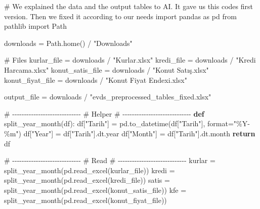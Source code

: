 \documentclass[
  11pt,
  a4paper,
  DIV=11,
  numbers=noendperiod]{scrartcl}
\newenvironment{Shaded}{\begin{snugshade}}{\end{snugshade}}
\newcommand{\BuiltInTok}[1]{\textcolor[rgb]{0.00,0.23,0.31}{#1}}
\newcommand{\CommentTok}[1]{\textcolor[rgb]{0.37,0.37,0.37}{#1}}
\newcommand{\ControlFlowTok}[1]{\textcolor[rgb]{0.00,0.23,0.31}{\textbf{#1}}}
\newcommand{\ImportTok}[1]{\textcolor[rgb]{0.00,0.46,0.62}{#1}}
\newcommand{\KeywordTok}[1]{\textcolor[rgb]{0.00,0.23,0.31}{\textbf{#1}}}
\newcommand{\NormalTok}[1]{\textcolor[rgb]{0.00,0.23,0.31}{#1}}
\newcommand{\OperatorTok}[1]{\textcolor[rgb]{0.37,0.37,0.37}{#1}}
\newcommand{\StringTok}[1]{\textcolor[rgb]{0.13,0.47,0.30}{#1}}
\begin{document}
\begin{Shaded}
\begin{Highlighting}[]
\CommentTok{\# We explained the data and the output tables to AI. It gave us this code\textquotesingle{}s first version. Then we fixed it according to our needs}
\ImportTok{import}\NormalTok{ pandas }\ImportTok{as}\NormalTok{ pd}
\ImportTok{from}\NormalTok{ pathlib }\ImportTok{import}\NormalTok{ Path}

\NormalTok{downloads }\OperatorTok{=}\NormalTok{ Path.home() }\OperatorTok{/} \StringTok{"Downloads"}

\CommentTok{\# Files}
\NormalTok{kurlar\_file }\OperatorTok{=}\NormalTok{ downloads }\OperatorTok{/} \StringTok{"Kurlar.xlsx"}
\NormalTok{kredi\_file }\OperatorTok{=}\NormalTok{ downloads }\OperatorTok{/} \StringTok{"Kredi Harcama.xlsx"}
\NormalTok{konut\_satis\_file }\OperatorTok{=}\NormalTok{ downloads }\OperatorTok{/} \StringTok{"Konut Satış.xlsx"}
\NormalTok{konut\_fiyat\_file }\OperatorTok{=}\NormalTok{ downloads }\OperatorTok{/} \StringTok{"Konut Fiyat Endexi.xlsx"}

\NormalTok{output\_file }\OperatorTok{=}\NormalTok{ downloads }\OperatorTok{/} \StringTok{"evds\_preprocessed\_tables\_fixed.xlsx"}

\CommentTok{\# {-}{-}{-}{-}{-}{-}{-}{-}{-}{-}{-}{-}{-}{-}{-}{-}{-}{-}{-}{-}{-}{-}{-}{-}{-}{-}{-}{-}{-}}
\CommentTok{\# Helper}
\CommentTok{\# {-}{-}{-}{-}{-}{-}{-}{-}{-}{-}{-}{-}{-}{-}{-}{-}{-}{-}{-}{-}{-}{-}{-}{-}{-}{-}{-}{-}{-}}
\KeywordTok{def}\NormalTok{ split\_year\_month(df):}
\NormalTok{    df[}\StringTok{"Tarih"}\NormalTok{] }\OperatorTok{=}\NormalTok{ pd.to\_datetime(df[}\StringTok{"Tarih"}\NormalTok{], }\BuiltInTok{format}\OperatorTok{=}\StringTok{"\%Y{-}\%m"}\NormalTok{)}
\NormalTok{    df[}\StringTok{"Year"}\NormalTok{] }\OperatorTok{=}\NormalTok{ df[}\StringTok{"Tarih"}\NormalTok{].dt.year}
\NormalTok{    df[}\StringTok{"Month"}\NormalTok{] }\OperatorTok{=}\NormalTok{ df[}\StringTok{"Tarih"}\NormalTok{].dt.month}
    \ControlFlowTok{return}\NormalTok{ df}

\CommentTok{\# {-}{-}{-}{-}{-}{-}{-}{-}{-}{-}{-}{-}{-}{-}{-}{-}{-}{-}{-}{-}{-}{-}{-}{-}{-}{-}{-}{-}{-}}
\CommentTok{\# Read}
\CommentTok{\# {-}{-}{-}{-}{-}{-}{-}{-}{-}{-}{-}{-}{-}{-}{-}{-}{-}{-}{-}{-}{-}{-}{-}{-}{-}{-}{-}{-}{-}}
\NormalTok{kurlar }\OperatorTok{=}\NormalTok{ split\_year\_month(pd.read\_excel(kurlar\_file))}
\NormalTok{kredi }\OperatorTok{=}\NormalTok{ split\_year\_month(pd.read\_excel(kredi\_file))}
\NormalTok{satis }\OperatorTok{=}\NormalTok{ split\_year\_month(pd.read\_excel(konut\_satis\_file))}
\NormalTok{kfe }\OperatorTok{=}\NormalTok{ split\_year\_month(pd.read\_excel(konut\_fiyat\_file))}


\end{Highlighting}
\end{Shaded}
\end{document}
